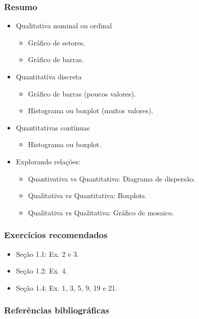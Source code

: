 \documentclass[11pt]{beamer}
\begin{document}
\begin{frame}
\frametitle{Resumo}
\begin{itemize}
\item
  Qualitativa nominal ou ordinal

  \begin{itemize}
  \item
    Gráfico de setores.
  \item
    Gráfico de barras.
  \end{itemize}
\item
  Quantitativa discreta

  \begin{itemize}
  \item
    Gráfico de barras (poucos valores).
  \item
    Histograma ou boxplot (muitos valores).
  \end{itemize}
\item
  Quantitativas contínuas

  \begin{itemize}
  \item
    Histograma ou boxplot.
  \end{itemize}
\item
  Explorando relações:

  \begin{itemize}
  \item
    Quantivativa vs Quantitativa: Diagrama de dispersão.
  \item
    Qualitativa vs Quantitativa: Boxplots.
  \item
    Qualitativa vs Qualitativa: Gráfico de mosaico.
  \end{itemize}
\end{itemize}
\end{frame}

\begin{frame}
\frametitle{Exercícios recomendados}

\begin{itemize}
\item
  Seção 1.1: Ex. 2 e 3.
\item
  Seção 1.2: Ex. 4.
\item
  Seção 1.4: Ex. 1, 3, 5, 9, 19 e 21.
\end{itemize}
\end{frame}

\begin{frame}
\frametitle{Referências bibliográficas}
\printbibliography
\end{frame}
\end{document}
